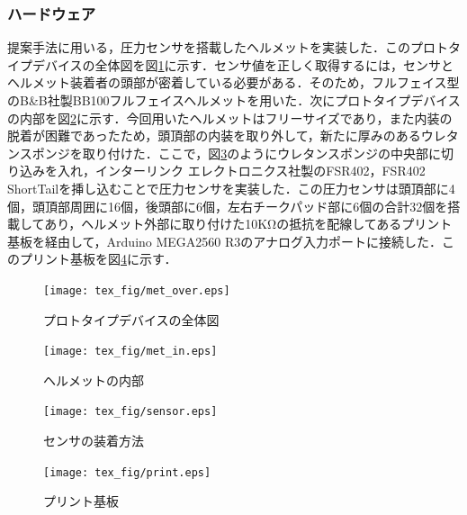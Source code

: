 \documentclass[a4j]{jarticle}%
\begin{document}
\subsubsection{ハードウェア}
提案手法に用いる，圧力センサを搭載したヘルメットを実装した．このプロトタイプデバイスの全体図を図\ref{met_over}に示す．センサ値を正しく取得するには，センサとヘルメット装着者の頭部が密着している必要がある．そのため，フルフェイス型のB\&B社製BB100フルフェイスヘルメットを用いた．次にプロトタイプデバイスの内部を図\ref{met_in}に示す．今回用いたヘルメットはフリーサイズであり，また内装の脱着が困難であったため，頭頂部の内装を取り外して，新たに厚みのあるウレタンスポンジを取り付けた．ここで，図\ref{sensor}のようにウレタンスポンジの中央部に切り込みを入れ，インターリンク エレクトロニクス社製のFSR402，FSR402 ShortTailを挿し込むことで圧力センサを実装した．この圧力センサは頭頂部に4個，頭頂部周囲に16個，後頭部に6個，左右チークパッド部に6個の合計32個を搭載してあり，ヘルメット外部に取り付けた10KΩの抵抗を配線してあるプリント基板を経由して，Arduino MEGA2560 R3のアナログ入力ポートに接続した．このプリント基板を図\ref{print}に示す．

\begin{figure}[!t]
  \begin{center}
    \texttt{[image: tex\_fig/met\_over.eps]}
  \end{center}
    \vspace{-8mm}
  \caption{プロトタイプデバイスの全体図}
  \label{met_over}
\end{figure}

\begin{figure}[!t]
  \begin{center}
    \texttt{[image: tex\_fig/met\_in.eps]}
  \end{center}
    \vspace{-8mm}
  \caption{ヘルメットの内部}
  \label{met_in}
\end{figure}

\begin{figure}[!t]
  \begin{center}
    \texttt{[image: tex\_fig/sensor.eps]}
  \end{center}
    \vspace{-8mm}
  \caption{センサの装着方法}
  \label{sensor}
\end{figure}

\begin{figure}[!t]
  \begin{center}
    \texttt{[image: tex\_fig/print.eps]}
  \end{center}
    \vspace{-8mm}
  \caption{プリント基板}
  \label{print}
\end{figure}
\end{document}
